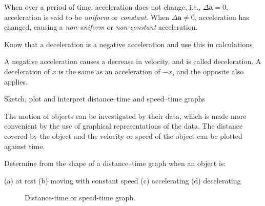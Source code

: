 When over a period of time, acceleration does not change, i.e., $\Delta \bm{a} = 0$, acceleration
is said to be \textit{uniform} or \textit{constant}. When $\Delta \bm{a} \ne 0$, acceleration
has changed, causing a \textit{non-uniform} or \textit{non-constant} acceleration.

\begin{syllpoint}
Know that a deceleration is a negative acceleration and use this in calculations
\end{syllpoint}

A negative acceleration causes a decrease in velocity, and is called deceleration. A deceleration
of $x$ is the same as an acceleration of $-x$, and the opposite also applies.

\begin{syllpoint}
Sketch, plot and interpret distance–time and speed–time graphs
\end{syllpoint}

The motion of objects can be investigated by their data, which is made more convenient by the use 
of graphical representations of the data. The distance covered by the object and the velocity or
speed of the object can be plotted against time.

\begin{syllpoint}
Determine from the shape of a distance–time graph when an object is:

\indent(a) at rest
\indent(b) moving with constant speed
\indent(c) accelerating
\indent(d) decelerating
\end{syllpoint}

\begin{figure}
	\centering
	\begin{tikzpicture}

	\end{tikzpicture}
	\caption{Distance-time or speed-time graph.}
\end{figure}
